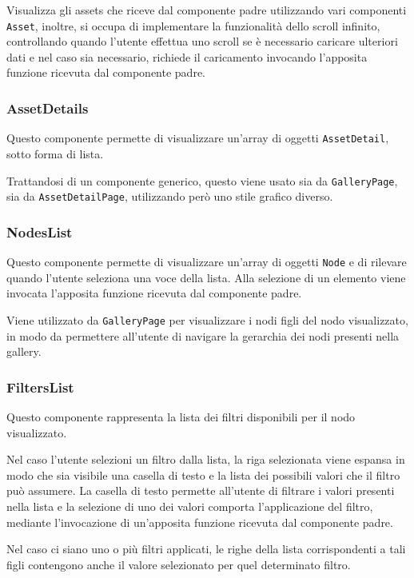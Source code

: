 Visualizza gli assets che riceve dal componente padre utilizzando vari componenti \texttt{Asset}, inoltre, si occupa di implementare la funzionalità dello scroll infinito, controllando quando l'utente effettua uno scroll se è necessario caricare ulteriori dati e nel caso sia necessario, richiede il caricamento invocando l'apposita funzione ricevuta dal componente padre.

\subsubsection{AssetDetails}

Questo componente permette di visualizzare un'array di oggetti \texttt{AssetDetail}, sotto forma di lista.

Trattandosi di un componente generico, questo viene usato sia da \texttt{GalleryPage}, sia da \texttt{AssetDetailPage}, utilizzando però uno stile grafico diverso.

\subsubsection{NodesList}

Questo componente permette di visualizzare un'array di oggetti \texttt{Node} e di rilevare quando l'utente seleziona una voce della lista.
Alla selezione di un elemento viene invocata l'apposita funzione ricevuta dal componente padre.

Viene utilizzato da \texttt{GalleryPage} per visualizzare i nodi figli del nodo visualizzato, in modo da permettere all'utente di navigare la gerarchia dei nodi presenti nella gallery.
 
\subsubsection{FiltersList}

Questo componente rappresenta la lista dei filtri disponibili per il nodo visualizzato.

Nel caso l'utente selezioni un filtro dalla lista, la riga selezionata viene espansa in modo che sia visibile una casella di testo e la lista dei possibili valori che il filtro può assumere.
La casella di testo permette all'utente di filtrare i valori presenti nella lista e la selezione di uno dei valori comporta l'applicazione del filtro, mediante l'invocazione di un'apposita funzione ricevuta dal componente padre.

Nel caso ci siano uno o più filtri applicati, le righe della lista corrispondenti a tali figli contengono anche il valore selezionato per quel determinato filtro.

